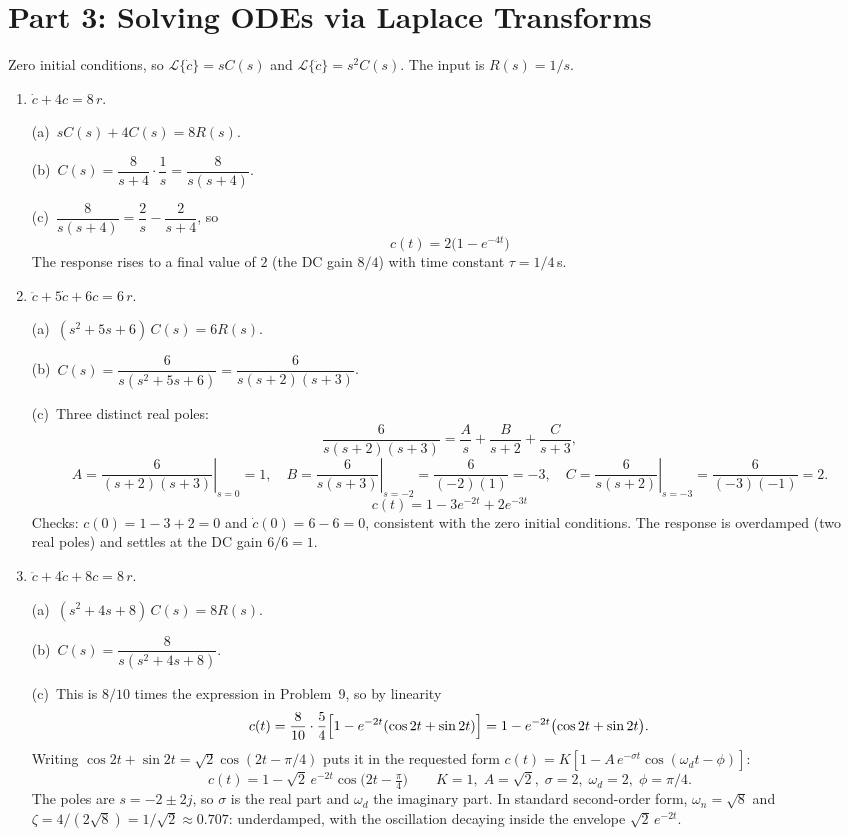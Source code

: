 \documentclass[11pt]{article}
\begin{document}
\section*{Part 3: Solving ODEs via Laplace Transforms}

Zero initial conditions, so $\mathcal{L}\{\dot c\} = sC(s)$ and
$\mathcal{L}\{\ddot c\} = s^2 C(s)$.  The input is $R(s) = 1/s$.

\begin{enumerate}[resume]

\item $\dot{c} + 4c = 8\,r$.

(a)~$sC(s) + 4C(s) = 8R(s)$.

(b)~$C(s) = \dfrac{8}{s+4}\cdot\dfrac{1}{s} = \dfrac{8}{s(s+4)}$.

(c)~$\dfrac{8}{s(s+4)} = \dfrac{2}{s} - \dfrac{2}{s+4}$, so
\[
  \boxed{c(t) = 2\bigl(1 - e^{-4t}\bigr)}
\]
The response rises to a final value of $2$ (the DC gain $8/4$) with time
constant $\tau = 1/4$\,s.

\item $\ddot{c} + 5\dot{c} + 6c = 6\,r$.

(a)~$(s^2 + 5s + 6)\,C(s) = 6R(s)$.

(b)~$C(s) = \dfrac{6}{s(s^2 + 5s + 6)} = \dfrac{6}{s(s+2)(s+3)}$.

(c)~Three distinct real poles:
\[
  \frac{6}{s(s+2)(s+3)} = \frac{A}{s} + \frac{B}{s+2} + \frac{C}{s+3},
\]
\[
  A = \left.\frac{6}{(s+2)(s+3)}\right|_{s=0} = 1,
  \quad
  B = \left.\frac{6}{s(s+3)}\right|_{s=-2} = \frac{6}{(-2)(1)} = -3,
  \quad
  C = \left.\frac{6}{s(s+2)}\right|_{s=-3} = \frac{6}{(-3)(-1)} = 2.
\]
\[
  \boxed{c(t) = 1 - 3e^{-2t} + 2e^{-3t}}
\]
Checks: $c(0) = 1 - 3 + 2 = 0$ and $\dot c(0) = 6 - 6 = 0$, consistent with
the zero initial conditions.  The response is overdamped (two real poles) and
settles at the DC gain $6/6 = 1$.

\item $\ddot{c} + 4\dot{c} + 8c = 8\,r$.

(a)~$(s^2 + 4s + 8)\,C(s) = 8R(s)$.

(b)~$C(s) = \dfrac{8}{s(s^2 + 4s + 8)}$.

(c)~This is $8/10$ times the expression in Problem~9, so by linearity
\[
  c(t) = \frac{8}{10}\cdot\frac{5}{4}\Bigl[1 - e^{-2t}(\cos 2t + \sin 2t)\Bigr]
       = 1 - e^{-2t}\bigl(\cos 2t + \sin 2t\bigr).
\]
Writing $\cos 2t + \sin 2t = \sqrt{2}\cos(2t - \pi/4)$ puts it in the
requested form $c(t) = K[1 - A\,e^{-\sigma t}\cos(\omega_d t - \phi)]$:
\[
  \boxed{c(t) = 1 - \sqrt{2}\,e^{-2t}\cos\!\bigl(2t - \tfrac{\pi}{4}\bigr)}
  \qquad
  K = 1,\; A = \sqrt{2},\; \sigma = 2,\; \omega_d = 2,\; \phi = \pi/4.
\]
The poles are $s = -2 \pm 2j$, so $\sigma$ is the real part and $\omega_d$
the imaginary part.  In standard second-order form, $\omega_n = \sqrt{8}$ and
$\zeta = 4/(2\sqrt{8}) = 1/\sqrt{2} \approx 0.707$: underdamped, with the
oscillation decaying inside the envelope $\sqrt{2}\,e^{-2t}$.

\end{enumerate}
\end{document}

